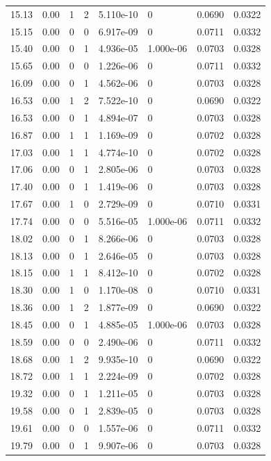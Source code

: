 \documentclass[preview]{standalone}
\begin{document}
{{{\begin{tabular}{L{1.2cm}C{1.2cm} C{0.3cm}C{0.5cm} C{1.4cm}C{1.4cm} C{1.4cm}C{1.4cm}}
  15.13  &  0.00  & 1     &  2 &  5.110e-10  & 0  & 0.0690 &  0.0322   \\ 
  15.15  &  0.00  & 0     &  0 &  6.917e-09  & 0  & 0.0711 &  0.0332   \\ 
  15.40  &  0.00  & 0     &  1 &  4.936e-05  & 1.000e-06  & 0.0703 &  0.0328   \\ 
  15.65  &  0.00  & 0     &  0 &  1.226e-06  & 0  & 0.0711 &  0.0332   \\ 
  16.09  &  0.00  & 0     &  1 &  4.562e-06  & 0  & 0.0703 &  0.0328   \\ 
  16.53  &  0.00  & 1     &  2 &  7.522e-10  & 0  & 0.0690 &  0.0322   \\ 
  16.53  &  0.00  & 0     &  1 &  4.894e-07  & 0  & 0.0703 &  0.0328   \\ 
  16.87  &  0.00  & 1     &  1 &  1.169e-09  & 0  & 0.0702 &  0.0328   \\ 
  17.03  &  0.00  & 1     &  1 &  4.774e-10  & 0  & 0.0702 &  0.0328   \\ 
  17.06  &  0.00  & 0     &  1 &  2.805e-06  & 0  & 0.0703 &  0.0328   \\ 
  17.40  &  0.00  & 0     &  1 &  1.419e-06  & 0  & 0.0703 &  0.0328   \\ 
  17.67  &  0.00  & 1     &  0 &  2.729e-09  & 0  & 0.0710 &  0.0331   \\ 
  17.74  &  0.00  & 0     &  0 &  5.516e-05  & 1.000e-06  & 0.0711 &  0.0332   \\ 
  18.02  &  0.00  & 0     &  1 &  8.266e-06  & 0  & 0.0703 &  0.0328   \\ 
  18.13  &  0.00  & 0     &  1 &  2.646e-05  & 0  & 0.0703 &  0.0328   \\ 
  18.15  &  0.00  & 1     &  1 &  8.412e-10  & 0  & 0.0702 &  0.0328   \\ 
  18.30  &  0.00  & 1     &  0 &  1.170e-08  & 0  & 0.0710 &  0.0331   \\ 
  18.36  &  0.00  & 1     &  2 &  1.877e-09  & 0  & 0.0690 &  0.0322   \\ 
  18.45  &  0.00  & 0     &  1 &  4.885e-05  & 1.000e-06  & 0.0703 &  0.0328   \\ 
  18.59  &  0.00  & 0     &  0 &  2.490e-06  & 0  & 0.0711 &  0.0332   \\ 
  18.68  &  0.00  & 1     &  2 &  9.935e-10  & 0  & 0.0690 &  0.0322   \\ 
  18.72  &  0.00  & 1     &  1 &  2.224e-09  & 0  & 0.0702 &  0.0328   \\ 
  19.32  &  0.00  & 0     &  1 &  1.211e-05  & 0  & 0.0703 &  0.0328   \\ 
  19.58  &  0.00  & 0     &  1 &  2.839e-05  & 0  & 0.0703 &  0.0328   \\ 
  19.61  &  0.00  & 0     &  0 &  1.557e-06  & 0  & 0.0711 &  0.0332   \\ 
  19.79  &  0.00  & 0     &  1 &  9.907e-06  & 0  & 0.0703 &  0.0328   \\ 
\hline 
\end{tabular} 

}}}
\end{document}
